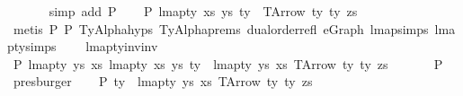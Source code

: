 \begin{isabellebody}
\ \ \ \ \ \isamarkupfalse%
\ {\isacharparenleft}{\kern0pt}simp\ add{\isacharcolon}{\kern0pt}\ P{}{\isacharparenright}{\kern0pt}\isanewline
\isanewline
\ \ \isamarkupfalse%
\ P{}{}{\isacharcolon}{\kern0pt}\ {\isachardoublequoteopen}lmap{\isacharunderscore}{\kern0pt}ty\ xs{\isacharprime}{\kern0pt}\ ys{\isacharprime}{\kern0pt}\ ty{\isacharprime}{\kern0pt}\ {\isacharequal}{\kern0pt}\ TArrow\ ty{}\ ty{}\ zs{\isachardoublequoteclose}\isanewline
\ \ \ \ \isamarkupfalse%
\ {\isacharparenleft}{\kern0pt}metis\ P{}{}\ P{}\ TyAlpha{\isachardot}{\kern0pt}hyps{\isacharparenleft}{\kern0pt}{}{\isacharcomma}{\kern0pt}{}{\isacharcomma}{\kern0pt}{}{\isacharcomma}{\kern0pt}{}{\isacharparenright}{\kern0pt}\ TyAlpha{\isachardot}{\kern0pt}prems{\isacharparenleft}{\kern0pt}{}{\isacharparenright}{\kern0pt}\ dual{\isacharunderscore}{\kern0pt}order{\isachardot}{\kern0pt}refl\ e{\isacharunderscore}{\kern0pt}Graph\ lmap{\isachardot}{\kern0pt}simps{\isacharparenleft}{\kern0pt}{}{\isacharparenright}{\kern0pt}\ lmap{\isacharunderscore}{\kern0pt}ty{\isachardot}{\kern0pt}simps{\isacharparenleft}{\kern0pt}{}{\isacharparenright}{\kern0pt}\isanewline
\ \ \ \ lmap{\isacharunderscore}{\kern0pt}ty{\isacharunderscore}{\kern0pt}inv{\isacharunderscore}{\kern0pt}inv{\isacharparenright}{\kern0pt}\isanewline
\ \ \isamarkupfalse%
\ P{}{}{\isacharcolon}{\kern0pt}\ {\isachardoublequoteopen}lmap{\isacharunderscore}{\kern0pt}ty\ ys{\isacharprime}{\kern0pt}\ xs{\isacharprime}{\kern0pt}\ {\isacharparenleft}{\kern0pt}lmap{\isacharunderscore}{\kern0pt}ty\ xs{\isacharprime}{\kern0pt}\ ys{\isacharprime}{\kern0pt}\ ty{\isacharprime}{\kern0pt}{\isacharparenright}{\kern0pt}\ {\isacharequal}{\kern0pt}\ lmap{\isacharunderscore}{\kern0pt}ty\ ys{\isacharprime}{\kern0pt}\ xs{\isacharprime}{\kern0pt}\ {\isacharparenleft}{\kern0pt}TArrow\ ty{}\ ty{}\ zs{\isacharparenright}{\kern0pt}{\isachardoublequoteclose}\isanewline
\ \ \ \ \ \isamarkupfalse%
\ P{}{}\ \isamarkupfalse%
\ presburger\isanewline
\ \ \isamarkupfalse%
\ P{}{}{\isacharcolon}{\kern0pt}\ {\isachardoublequoteopen}ty{\isacharprime}{\kern0pt}\ {\isacharequal}{\kern0pt}\ lmap{\isacharunderscore}{\kern0pt}ty\ ys{\isacharprime}{\kern0pt}\ xs{\isacharprime}{\kern0pt}\ {\isacharparenleft}{\kern0pt}TArrow\ ty{}\ ty{}\ zs{\isacharparenright}{\kern0pt}{\isachardoublequoteclose}\isanewline

\end{isabellebody}
